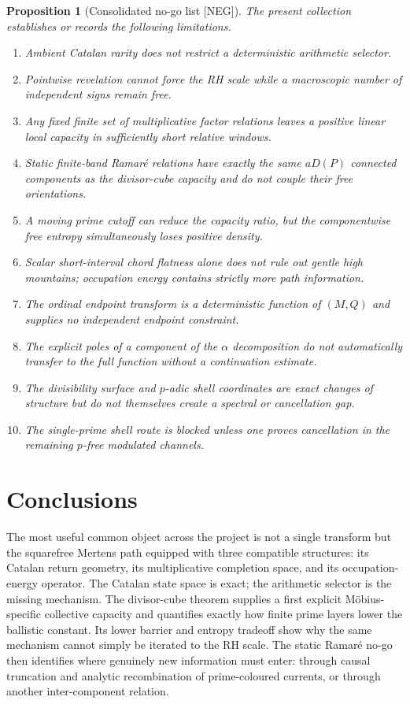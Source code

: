 \documentclass[11pt]{amsart}
\numberwithin{equation}{section}
\theoremstyle{plain}
\newtheorem{proposition}[theorem]{Proposition}
\theoremstyle{definition}
\theoremstyle{remark}
\newcommand{\Mert}{M}
\newcommand{\Sq}{Q}
\newcommand{\NEG}{\textup{[NEG]}}
\begin{document}
\begin{proposition}[Consolidated no-go list \NEG]
\label{prop:no-go-list}
The present collection establishes or records the following limitations.
\begin{enumerate}[label=(\roman*)]
\item Ambient Catalan rarity does not restrict a deterministic arithmetic selector.
\item Pointwise revelation cannot force the RH scale while a macroscopic number of independent signs remain free.
\item Any fixed finite set of multiplicative factor relations leaves a positive linear local capacity in sufficiently short relative windows.
\item Static finite-band Ramar\'e relations have exactly the same $aD(P)$ connected components as the divisor-cube capacity and do not couple their free orientations.
\item A moving prime cutoff can reduce the capacity ratio, but the componentwise free entropy simultaneously loses positive density.
\item Scalar short-interval chord flatness alone does not rule out gentle high mountains; occupation energy contains strictly more path information.
\item The ordinal endpoint transform is a deterministic function of $(\Mert,\Sq)$ and supplies no independent endpoint constraint.
\item The explicit poles of a component of the $\alpha$ decomposition do not automatically transfer to the full function without a continuation estimate.
\item The divisibility surface and $p$-adic shell coordinates are exact changes of structure but do not themselves create a spectral or cancellation gap.
\item The single-prime shell route is blocked unless one proves cancellation in the remaining $p$-free modulated channels.
\end{enumerate}
\end{proposition}

\section{Conclusions}
\label{sec:conclusions}

The most useful common object across the project is not a single transform but the squarefree Mertens path equipped with three compatible
structures: its Catalan return geometry, its multiplicative completion space, and its occupation-energy operator.  The Catalan state space is
exact; the arithmetic selector is the missing mechanism.  The divisor-cube theorem supplies a first explicit M\"obius-specific collective
capacity and quantifies exactly how finite prime layers lower the ballistic constant.  Its lower barrier and entropy tradeoff show why the same
mechanism cannot simply be iterated to the RH scale.  The static Ramar\'e no-go then identifies where genuinely new information must enter:
through causal truncation and analytic recombination of prime-coloured currents, or through another inter-component relation.
\end{document}
